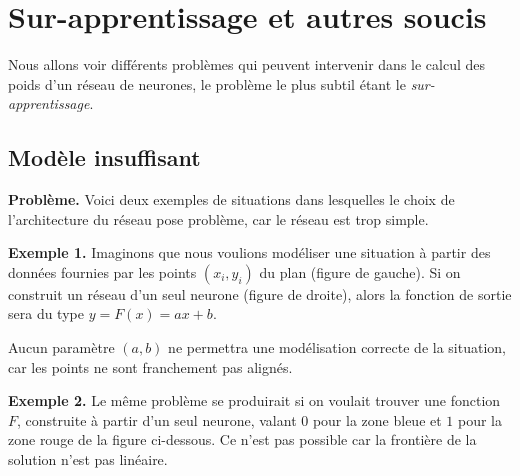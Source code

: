 \section{Sur-apprentissage et autres soucis}

Nous allons voir différents problèmes qui peuvent intervenir dans le calcul des poids d'un réseau de neurones, le problème le plus subtil étant le \emph{sur-apprentissage}. 


\subsection{Modèle insuffisant}

\textbf{Problème.}
Voici deux exemples de situations dans lesquelles le choix de l'architecture du réseau pose problème, car le réseau est trop simple. 

\bigskip

\textbf{Exemple 1.}
Imaginons que nous voulions modéliser une situation à partir des données fournies par les points $(x_i,y_i)$ du plan (figure de gauche). Si on construit un réseau d'un seul neurone (figure de droite), alors la fonction de sortie sera du type $y= F(x) = ax+b$.
\begin{center}
	\begin{minipage}{0.45\textwidth}
	\end{minipage}
	\begin{minipage}{0.45\textwidth}
	\end{minipage}
\end{center}

Aucun paramètre $(a,b)$ ne permettra une modélisation correcte de la situation, car les points ne sont franchement pas alignés.

\bigskip

\textbf{Exemple 2.}
Le même problème se produirait si on voulait trouver une fonction $F$, construite à partir d'un seul neurone, valant $0$ pour la zone bleue et $1$ pour la zone rouge de la figure ci-dessous. Ce n'est pas possible car la frontière de la solution n'est pas linéaire.

\begin{center}
	\begin{minipage}{0.45\textwidth}
	\end{minipage}
	\begin{minipage}{0.45\textwidth}
	\end{minipage}
\end{center}

